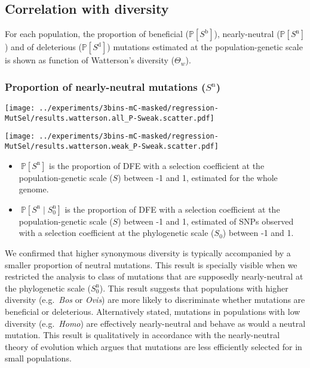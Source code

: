 \documentclass{article}
\newcommand{\proba}{\mathbb{P}}
\newcommand{\Sphy}{S_{0}}
\newcommand{\divWeak}{\Sphy^{\text{n}}}
\newcommand{\given}{\mid}
\newcommand{\Spop}{S}
\newcommand{\polyDel}{\Spop^{\text{d}}}
\newcommand{\polyNeutral}{\Spop^{\text{n}}}
\newcommand{\polyAdv}{\Spop^{\text{b}}}
\newcommand{\PpolyDel}{\proba \left[ \polyDel \right]}
\newcommand{\PpolyNeutral}{\proba \left[ \polyNeutral \right]}
\newcommand{\PpolyAdv}{\proba \left[ \polyAdv \right]}
\begin{document}
    \subsection{Correlation with diversity}
    For each population, the proportion of beneficial ($\PpolyAdv$), nearly-neutral ($\PpolyNeutral$) and of deleterious ($\PpolyDel$) mutations estimated at the population-genetic scale is shown as function of Watterson's diversity ($\Theta_w$).

    \subsubsection{Proportion of nearly-neutral mutations ($\polyNeutral$)}\label{subsec:proportion-nearly-neutral-mutations}
    \begin{minipage}{0.49\linewidth}
        \texttt{[image: ../experiments/3bins-mC-masked/regression-MutSel/results.watterson.all\_P-Sweak.scatter.pdf]}
    \end{minipage}
    \begin{minipage}{0.49\linewidth}
        \texttt{[image: ../experiments/3bins-mC-masked/regression-MutSel/results.watterson.weak\_P-Sweak.scatter.pdf]}
    \end{minipage}
    \begin{itemize}
        \item $\ \proba [ \polyNeutral ]$ is the proportion of DFE with a selection coefficient at the population-genetic scale ($\Spop$) between -1 and 1, estimated for the whole genome.
        \item $\ \proba [ \polyNeutral \given \divWeak ]$ is the proportion of DFE with a selection coefficient at the population-genetic scale ($\Spop$) between -1 and 1, estimated of SNPs observed with a selection coefficient at the phylogenetic scale ($\Sphy$) between -1 and 1.
    \end{itemize}

    We confirmed that higher synonymous diversity is typically accompanied by a smaller proportion of neutral mutations.
    This result is specially visible when we restricted the analysis to class of mutations that are supposedly nearly-neutral at the phylogenetic scale ($\divWeak$).
    This result suggests that populations with higher diversity (e.g.~\textit{Bos} or \textit{Ovis}) are more likely to discriminate whether mutations are beneficial or deleterious.
    Alternatively stated, mutations in populations with low diversity (e.g.~\textit{Homo}) are effectively nearly-neutral and behave as would a neutral mutation.
    This result is qualitatively in accordance with the nearly-neutral theory of evolution which argues that mutations are less efficiently selected for in small populations.
\end{document}
